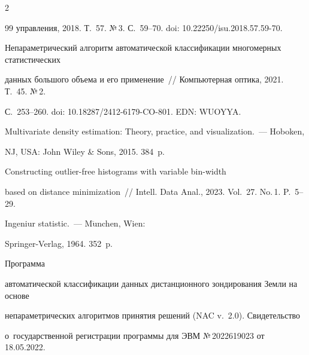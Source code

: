 \begin{multicols}{2}
{{\begin{thebibliography}{99}
управ\-ле\-ния, 2018. Т.~57. №\,3. С.~59--70. doi: 10.22250/isu.2018.57.59-70.






Непараметрический алгоритм автоматической классификации многомерных статистических 


данных большого объема и его применение~// Компьютерная оптика, 2021. Т.~45. №\,2. 


С.~253--260. doi: 10.18287/2412-6179-CO-801. EDN: WUOYYA.







 Multivariate density estimation: Theory, practice, and visualization.~--- Hoboken, 


NJ, USA: John Wiley \& Sons, 2015. 384~p.




 Constructing outlier-free histograms with variable bin-width 


based on distance minimization~// Intell. Data Anal., 2023. Vol.~27. No.\,1. P.~5--29.




 Ingeniur statistic.~--- M$\ddot{\mbox{u}}$nchen, Wien: 


Springer-Verlag, 1964. 352~p.




 Программа 


автоматической классификации данных дистанционного зондирования Земли на основе 


непараметрических алгоритмов принятия решений (NAC v.~2.0). Свидетельство 


о~государственной регистрации программы для ЭВМ №\,2022619023 от 18.05.2022.


\end{thebibliography}





 }


 }





\end{multicols}





